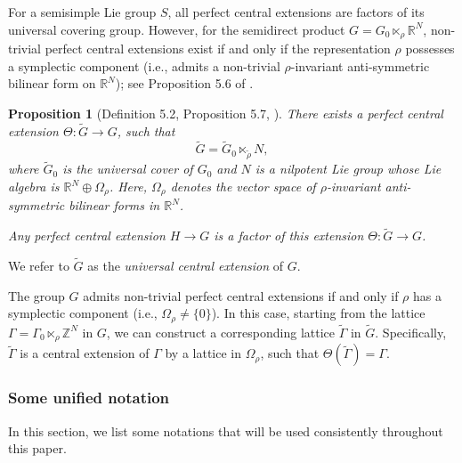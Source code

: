 \documentclass[11pt]{amsart}
\numberwithin{equation}{section}
\theoremstyle{plain}
\newtheorem{prop}[thm]{Proposition}
\begin{document}
For a semisimple Lie group $S$, all perfect central extensions are factors of its universal covering group. However, for the semidirect product $G = G_0 \ltimes_\rho \mathbb{R}^N$, non-trivial perfect central extensions exist if and only if the representation $\rho$ possesses a symplectic component (i.e., admits a non-trivial $\rho$-invariant anti-symmetric bilinear form on $\mathbb{R}^N$); see Proposition 5.6 of \cite{VinWang}.

\begin{prop}[Definition 5.2, Proposition 5.7, \cite{VinWang}]
    There exists a perfect central extension $\Theta: \widetilde{G} \to G$, such that
    \[
    \widetilde{G} = \widetilde{G}_0 \ltimes_{\widetilde{\rho}} N,
    \]
    where $\widetilde{G}_0$ is the universal cover of $G_0$ and $N$ is a nilpotent Lie group whose Lie algebra is $\mathbb{R}^N \oplus \Omega_\rho$. Here, $\Omega_\rho$ denotes the vector space of $\rho$-invariant anti-symmetric bilinear forms in $\mathbb{R}^N$.
    
    Any perfect central extension $H \to G$ is a factor of this extension $\Theta: \widetilde{G} \to G$.
\end{prop}

We refer to $\widetilde{G}$ as the \emph{universal central extension} of $G$.

The group $G$ admits non-trivial perfect central extensions if and only if $\rho$ has a symplectic component (i.e., $\Omega_\rho \neq \{0\}$). In this case, starting from the lattice $\Gamma = \Gamma_0 \ltimes_\rho \mathbb{Z}^N$ in $G$, we can construct a corresponding lattice $\widetilde{\Gamma}$ in $\widetilde{G}$. Specifically, $\widetilde{\Gamma}$ is a central extension of $\Gamma$ by a lattice in $\Omega_\rho$, such that $\Theta(\widetilde{\Gamma}) = \Gamma$.

\subsubsection{Some unified notation}

In this section, we list some notations that will be used consistently throughout this paper.
\end{document}
